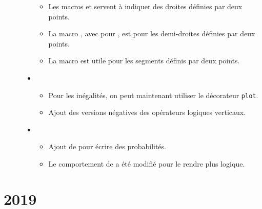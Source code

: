 \documentclass[12pt,a4paper]{book}
\begin{document}
\begin{description}
\begin{itemize}[itemsep=.5em]
\begin{itemize}[itemsep=.5em]
        \item Les macros  et  servent à indiquer des droites définies par deux points.

        \item La macro , avec  pour , est pour les demi-droites définies par deux points.

        \item La macro  est utile pour les segments définis par deux points.
    \end{itemize}




    \item {}
    \begin{itemize}[itemsep=.5em]
        \item Pour les inégalités, on peut maintenant utiliser le décorateur \verb+plot+.

		\item Ajout des versions négatives des opérateurs logiques verticaux.
    \end{itemize}




    \item {}
    \begin{itemize}[itemsep=.5em]
        \item Ajout de  pour écrire des probabilités.

		\item Le comportement de  a été modifié pour le rendre plus logique.
    \end{itemize}
\end{itemize}

\end{description}



\section{2019}
\end{document}

